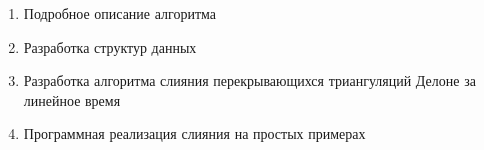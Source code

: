\documentclass[12pt]{article}
\begin{document}
\begin{enumerate}
	\item Подробное описание алгоритма
	\item Разработка структур данных
	\item Разработка алгоритма слияния перекрывающихся триангуляций Делоне за линейное время
	\item Программная реализация слияния на простых примерах
\end{enumerate}

\newpage




\end{document}
